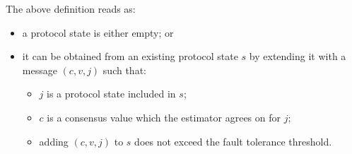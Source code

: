 The above definition reads as:
\begin{itemize}
    \item a protocol state is either empty; or
    \item it can be obtained from an existing protocol state $s$ by extending
        it with a message $(c, v, j)$ such that:
        \begin{itemize}
            \item $j$ is a protocol state included in $s$;
            \item $c$ is a consensus value which the estimator agrees on for $j$;
            \item adding $(c,v,j)$ to $s$ does not exceed the fault tolerance threshold.
        \end{itemize}
\end{itemize}